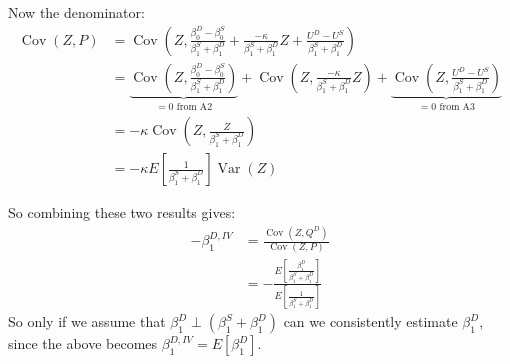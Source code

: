 \documentclass{article}
\begin{document}
\begin{solution}
Now the denominator:
\begin{align*}
    \operatorname{Cov}(Z,P) &= \operatorname{Cov} \left(Z,\frac{\beta_{0}^{D} - \beta_{0}^{S}}{\beta_1^S+\beta_1^D} + \frac{ - \kappa}{\beta_1^S+\beta_1^D} Z + \frac{U^D - U^S}{\beta_1^S+\beta_1^D}  \right) \tag{Plug in for P}\\
    &= \underbrace{\operatorname{Cov} \left(Z,\frac{\beta_{0}^{D} - \beta_{0}^{S}}{\beta_1^S+\beta_1^D} \right)}_\text{$=0$ from A2} +  \operatorname{Cov} \left(Z, \frac{ - \kappa}{\beta_1^S+\beta_1^D} Z \right) + \underbrace{\operatorname{Cov} \left(Z, \frac{U^D - U^S}{\beta_1^S+\beta_1^D}  \right)}_\text{$=0$ from A3} \\
    &= -\kappa \operatorname{Cov} \left(Z, \frac{Z}{\beta_1^S+\beta_1^D} \right) \\
    &= -\kappa E\left[ \frac{1}{\beta_1^S+\beta_1^D}\right] \operatorname{Var} \left(Z  \right) \tag{From A3}
\end{align*}
\end{solution}
So combining these two results gives:
\begin{align*}
    -\beta_1^{D,IV} &= \frac{\operatorname{Cov}(Z,Q^D)}{\operatorname{Cov}(Z,P)}  \\
    &= - \frac{E\left [ \frac{\beta_1^D}{\beta_1^S+\beta_1^D} \right]}{E\left[ \frac{1}{\beta_1^S+\beta_1^D}\right]}
\end{align*}
So only if we assume that $\beta_1^D \perp (\beta_1^S+\beta_1^D)$ can we consistently estimate $\beta_1^D$, since the above becomes $\beta_1^{D,IV}=E[\beta_1^D]$.
\end{document}
